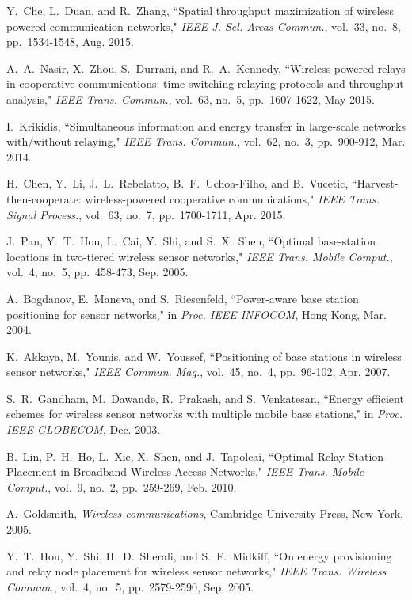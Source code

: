 \documentclass[journal, draftcls, one column, 12pt]{IEEEtran}
\begin{document}
\begin{thebibliography}{1}
Y.~Che, L.~Duan, and R.~Zhang, ``Spatial throughput maximization of wireless powered communication networks," \emph{IEEE J. Sel. Areas Commun.}, vol.~33, no.~8, pp.~1534-1548, Aug. 2015.

A.~A.~Nasir, X.~Zhou, S.~Durrani, and R.~A.~Kennedy, ``Wireless-powered relays in cooperative communications: time-switching relaying protocols and throughput analysis," \emph{IEEE Trans. Commun.}, vol.~63, no.~5, pp.~1607-1622, May 2015.

I.~Krikidis, ``Simultaneous information and energy transfer in large-scale networks with/without relaying," \emph{IEEE Trans. Commun.}, vol.~62, no.~3, pp.~900-912, Mar. 2014.

H.~Chen, Y.~Li, J.~L.~Rebelatto, B.~F.~Uchoa-Filho, and B.~Vucetic, ``Harvest-then-cooperate: wireless-powered cooperative communications," \emph{IEEE Trans. Signal Process.}, vol.~63, no.~7, pp.~1700-1711, Apr. 2015.

J.~Pan, Y.~T.~Hou, L.~Cai, Y.~Shi, and S.~X.~Shen, ``Optimal base-station locations in two-tiered wireless sensor networks," \emph{IEEE Trans. Mobile Comput.}, vol.~4, no.~5, pp.~458-473, Sep. 2005.

A.~Bogdanov, E.~Maneva, and S.~Riesenfeld, ``Power-aware base station positioning for sensor networks," in \emph{Proc. IEEE INFOCOM}, Hong Kong, Mar. 2004.

K.~Akkaya, M.~Younis, and W.~Youssef, ``Positioning of base stations in wireless sensor networks," \emph{IEEE Commun. Mag.}, vol.~45, no.~4, pp.~96-102, Apr. 2007.

S.~R.~Gandham, M.~Dawande, R.~Prakash, and S.~Venkatesan, ``Energy efficient schemes for wireless sensor networks with multiple mobile base stations," in \emph{Proc. IEEE GLOBECOM}, Dec. 2003.

B.~Lin, P.~H.~Ho, L.~Xie, X.~Shen, and J.~Tapolcai, ``Optimal Relay Station Placement in Broadband Wireless Access Networks," \emph{IEEE Trans. Mobile Comput.}, vol.~9, no.~2, pp.~259-269, Feb. 2010.

A.~Goldsmith, \emph{Wireless communications}, Cambridge University Press, New York, 2005.

Y.~T.~Hou, Y.~Shi, H.~D.~Sherali, and S.~F.~Midkiff, ``On energy provisioning and relay node placement for wireless sensor networks," \emph{IEEE Trans. Wireless Commun.}, vol.~4, no.~5, pp.~2579-2590, Sep. 2005.


\end{thebibliography}
\end{document}
